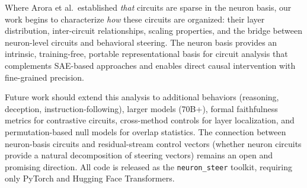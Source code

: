 \documentclass[11pt]{article}
\begin{document}
Where Arora et al.\ established \emph{that} circuits are sparse in the neuron basis, our work begins to characterize \emph{how} these circuits are organized: their layer distribution, inter-circuit relationships, scaling properties, and the bridge between neuron-level circuits and behavioral steering.
The neuron basis provides an intrinsic, training-free, portable representational basis for circuit analysis that complements SAE-based approaches and enables direct causal intervention with fine-grained precision.

Future work should extend this analysis to additional behaviors (reasoning, deception, instruction-following), larger models (70B+), formal faithfulness metrics for contrastive circuits, cross-method controls for layer localization, and permutation-based null models for overlap statistics.
The connection between neuron-basis circuits and residual-stream control vectors (whether neuron circuits provide a natural decomposition of steering vectors) remains an open and promising direction.
All code is released as the \texttt{neuron\_steer} toolkit, requiring only PyTorch and Hugging Face Transformers.


\end{document}
